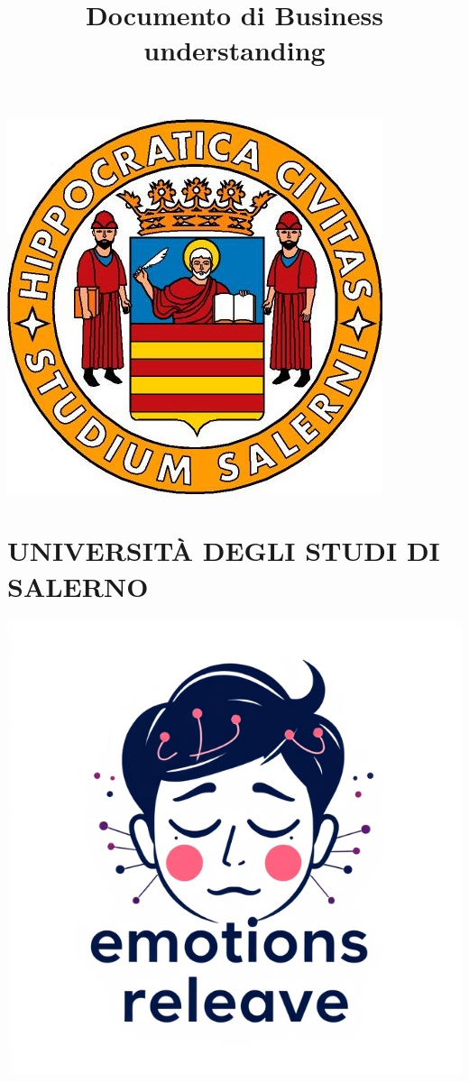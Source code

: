 \documentclass{article}
\title{Documento di Business understanding}
\author{}
\date{}
\begin{document}
\begin{center}
\includegraphics[scale = 0.5]{images/unisa}
\vspace{0.5cm}
\section*{\fontsize{20pt}{24pt}\selectfont\textbf{\textcolor[HTML]{808080}{UNIVERSIT\`A DEGLI STUDI DI SALERNO}}}
\vspace{0.5cm}
    \includegraphics[scale = 0.3]{images/logo}


\end{center}
\end{document}
